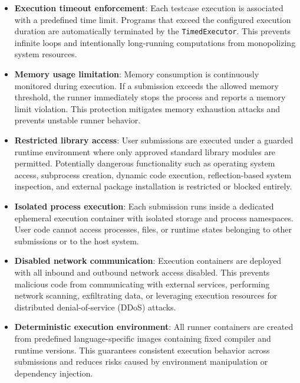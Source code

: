\begin{itemize}

\item \textbf{Execution timeout enforcement}: 
Each testcase execution is associated with a predefined time limit. Programs that exceed the configured execution duration are automatically terminated by the \texttt{TimedExecutor}. This prevents infinite loops and intentionally long-running computations from monopolizing system resources.

\item \textbf{Memory usage limitation}: 
Memory consumption is continuously monitored during execution. If a submission exceeds the allowed memory threshold, the runner immediately stops the process and reports a memory limit violation. This protection mitigates memory exhaustion attacks and prevents unstable runner behavior.

\item \textbf{Restricted library access}: 
User submissions are executed under a guarded runtime environment where only approved standard library modules are permitted. Potentially dangerous functionality such as operating system access, subprocess creation, dynamic code execution, reflection-based system inspection, and external package installation is restricted or blocked entirely.

\item \textbf{Isolated process execution}: 
Each submission runs inside a dedicated ephemeral execution container with isolated storage and process namespaces. User code cannot access processes, files, or runtime states belonging to other submissions or to the host system.

\item \textbf{Disabled network communication}: 
Execution containers are deployed with all inbound and outbound network access disabled. This prevents malicious code from communicating with external services, performing network scanning, exfiltrating data, or leveraging execution resources for distributed denial-of-service (DDoS) attacks.

\item \textbf{Deterministic execution environment}: 
All runner containers are created from predefined language-specific images containing fixed compiler and runtime versions. This guarantees consistent execution behavior across submissions and reduces risks caused by environment manipulation or dependency injection.

\end{itemize}